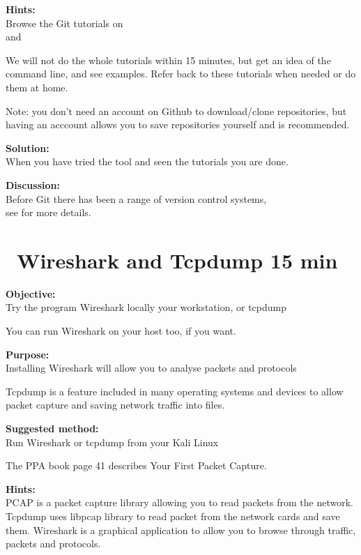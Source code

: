 \documentclass[a4paper,11pt,notitlepage]{report}
\begin{document}
{\bf Hints:}\\
Browse the Git tutorials on \\
and 

We will not do the whole tutorials within 15 minutes, but get an idea of the command line, and see examples. Refer back to these tutorials when needed or do them at home.

Note: you don't need an account on Github to download/clone repositories, but having an acccount allows you to save repositories yourself and is recommended.

{\bf Solution:}\\
When you have tried the tool and seen the tutorials you are done.

{\bf Discussion:}\\
Before Git there has been a range of version control systems,\\
see  for more details.





\chapter{\faExclamationTriangle\ Wireshark and Tcpdump 15 min}
\label{ex:wireshark-install}



{\bf Objective:}\\
Try the program Wireshark locally your workstation, or tcpdump

You can run Wireshark on your host too, if you want.

{\bf Purpose:}\\
Installing Wireshark will allow you to analyse packets and protocols

Tcpdump is a feature included in many operating systems and devices to allow packet capture and saving network traffic into files.

{\bf Suggested method:}\\
Run Wireshark or tcpdump from your Kali Linux

The PPA book page 41 describes Your First Packet Capture.

{\bf Hints:}\\
PCAP is a packet capture library allowing you to read packets from the network.
Tcpdump uses libpcap library to read packet from the network cards and save them.
Wireshark is a graphical application to allow you to browse through traffic, packets and protocols.
\end{document}
